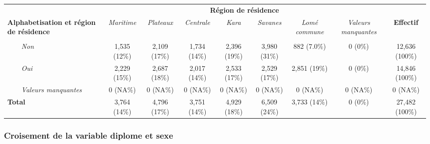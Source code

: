\documentclass[
]{article}
\begin{document}
\begin{table}[!t]
\fontsize{12.0pt}{14.4pt}\selectfont
\begin{tabular*}{\linewidth}{@{\extracolsep{\fill}}lcccccccc}
\toprule
 & \multicolumn{7}{c}{\textbf{Région de résidence}} &  \\ 
\cmidrule(lr){2-8}
\textbf{Alphabetisation et région de résidence} & \emph{Maritime} & \emph{Plateaux} & \emph{Centrale} & \emph{Kara} & \emph{Savanes} & \emph{Lomé commune} & \emph{Valeurs manquantes} & \textbf{Effectif} \\ 
\midrule\addlinespace[2.5pt]
{\bfseries Alphabetisation} &  &  &  &  &  &  &  &  \\ 
{\itshape     Non} & 1,535 (12\%) & 2,109 (17\%) & 1,734 (14\%) & 2,396 (19\%) & 3,980 (31\%) & 882 (7.0\%) & 0 (0\%) & 12,636 (100\%) \\ 
{\itshape     Oui} & 2,229 (15\%) & 2,687 (18\%) & 2,017 (14\%) & 2,533 (17\%) & 2,529 (17\%) & 2,851 (19\%) & 0 (0\%) & 14,846 (100\%) \\ 
{\itshape     Valeurs manquantes} & 0 (NA\%) & 0 (NA\%) & 0 (NA\%) & 0 (NA\%) & 0 (NA\%) & 0 (NA\%) & 0 (NA\%) & 0 (NA\%) \\ 
{\bfseries Total} & 3,764 (14\%) & 4,796 (17\%) & 3,751 (14\%) & 4,929 (18\%) & 6,509 (24\%) & 3,733 (14\%) & 0 (0\%) & 27,482 (100\%) \\ 
\bottomrule
\end{tabular*}
\end{table}

\subsubsection{Croisement de la variable diplome et
sexe}\label{croisement-de-la-variable-diplome-et-sexe}
\end{document}
